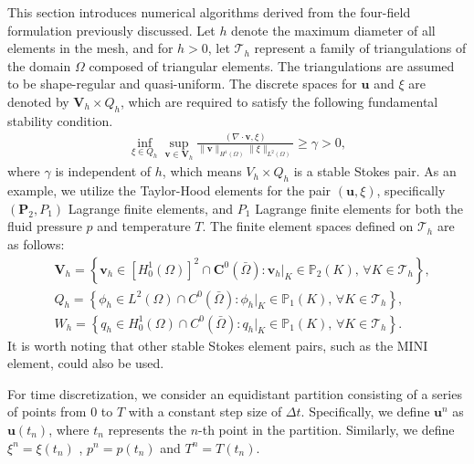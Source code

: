 \documentclass{article}
\numberwithin{equation}{section}
\begin{document}
This section introduces numerical algorithms derived from the four-field formulation previously discussed. Let \( h \) denote the maximum diameter of all elements in the mesh, and for \( h > 0 \), let \(\mathcal{T}_h\) represent a family of triangulations of the domain \(\Omega\) composed of triangular elements. The triangulations are assumed to be shape-regular and quasi-uniform. The discrete spaces for \(\bm{u}\) and \(\xi\) are denoted by \(\bm{V}_h \times Q_h\), which are required to satisfy the following fundamental stability condition.
 \begin{equation}\label{infsup for dis}
\begin{aligned} 
 \inf_{\xi\in Q_h}\sup_{\bm v\in \bm{V}_h}\frac{(\nabla\cdot\bm v,\xi)}{\|\bm v\|_{H^1(\Omega)}\|\xi\|_{L^2(\Omega)}}\ge \gamma>0,
\end{aligned}
\end{equation}
 where $\gamma$ is independent of $h$, which means $V_h\times Q_h$ is a stable Stokes pair.  As an example, we utilize the Taylor-Hood elements for the pair \((\bm{u}, \xi)\), specifically \((\bm{P}_2, P_1)\) Lagrange finite elements, and \(P_1\) Lagrange finite elements for both the fluid pressure \(p\) and temperature \(T\). The finite element spaces defined on \(\mathcal{T}_h\) are as follows:
\[
\begin{aligned}
&\bm{V}_h = \left\{ \bm{v}_h \in [H_0^1(\Omega)]^2 \cap \bm{C}^0(\bar{\Omega}) : \bm{v}_h|_K \in \mathbb{P}_2(K), \, \forall K \in \mathcal{T}_h \right\}, \\
&Q_h = \left\{ \phi_h \in L^2(\Omega) \cap C^0(\bar{\Omega}) : \phi_h|_K \in \mathbb{P}_1(K), \, \forall K \in \mathcal{T}_h \right\}, \\
&W_h = \left\{ q_h \in H_0^1(\Omega) \cap C^0(\bar{\Omega}) : q_h|_K \in \mathbb{P}_1(K), \, \forall K \in \mathcal{T}_h \right\}.
\end{aligned}
\]
It is worth noting that other stable Stokes element pairs, such as the MINI element, could also be used. %
 
For time discretization, we consider an equidistant partition consisting of a series of points from $0$ to $T$ with a constant step size of $\Delta t$. Specifically, we define $\bm u^n$ as $\bm u(t_n)$, where $t_n$ represents the $n$-th point in the partition. Similarly, we define $\xi^n=\xi(t_n)$ , $p^n=p(t_n)$ and $T^n=T(t_n)$.
 
\end{document}
